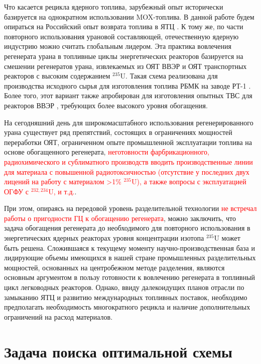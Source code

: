 Что касается рецикла ядерного топлива, зарубежный опыт исторически базируется на однократном использовании MOX-топлива.
В данной работе будем опираться на Российский опыт возврата топлива в ЯТЦ \cite{international2003iaea}.
К тому же, по части повторного использования урановой составляющей, отечественную ядерную индустрию можно считать глобальным лидером.
Эта практика вовлечения регенерата урана в топливные циклы энергетических реакторов базируется на смешении регенератов урана, извлекаемых из ОЯТ ВВЭР и ОЯТ транспортных реакторов с высоким содержанием $^{235}$U.
Такая схема реализована для производства исходного сырья для изготовления топлива РБМК на заводе РТ-1 \cite{volkVozvratUranaIz2010}.
Более того, этот вариант также апробирован для изготовления опытных ТВС для реакторов ВВЭР \cite{proselkovAnalizVozmozhnostiIspolzovaniya2003}, требующих более высокого уровня обогащения.

На сегодняшний день для широкомасштабного использования регенерированного урана существует ряд препятствий, состоящих в ограничениях мощностей переработки ОЯТ, ограниченном опыте промышленной эксплуатации топлива на основе обогащенного регенерата, \textcolor{red}{неготовности фарбрикационного, радиохимического и сублиматного производств вводить производственные линии для материала с повышенной радиотоксичностью (отсутствие у последних двух лицений на работу с материалом >1\% $^{235}$U), а также вопросы с эксплуатацией ОГФУ с $^{232,234}$U, и т.д.}.

При этом, опираясь на передовой уровень разделительной технологии \textcolor{red}{не встречал работы о пригодности ГЦ к обогащению регенерата}, можно заключить, что задача обогащения регенерата до необходимого для повторного использования в энергетических ядерных реакторах уровня концентрации изотопа $^{235}$U может быть решена.
Сложившаяся к текущему моменту научно-производственная база и лидирующие объемы имеющихся в нашей стране промышленных разделительных мощностей, основанных на центробежном методе разделения, являются основным аргументом в пользу готовности к вовлечению регенерата в топливный цикл легководных реакторов.
Однако, ввиду далекоидущих планов отрасли по замыканию ЯТЦ и развитию международных топливных поставок, необходимо предполагать необходимость  многократного рецикла и наличие дополнительных ограничений на расход материалов.


\section{Задача поиска оптимальной схемы}

